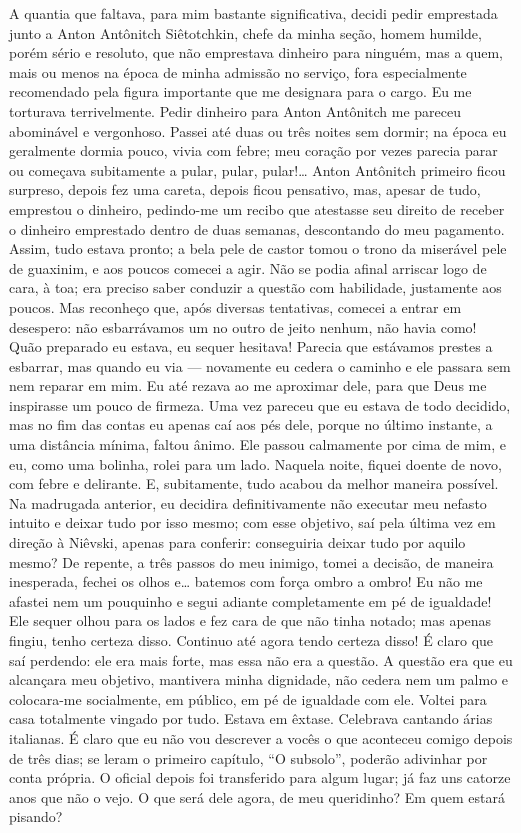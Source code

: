 A quantia que faltava, para mim bastante significativa, decidi pedir
emprestada junto a Anton Antônitch Siêtotchkin, chefe da minha seção,
homem humilde, porém sério e resoluto, que não emprestava dinheiro para
ninguém, mas a quem, mais ou menos na época de minha admissão no
serviço, fora especialmente recomendado pela figura importante que me
designara para o cargo. Eu me torturava terrivelmente. Pedir dinheiro
para Anton Antônitch me pareceu abominável e vergonhoso. Passei até
duas ou três noites sem dormir; na época eu geralmente dormia pouco,
vivia com febre; meu coração por vezes parecia parar ou começava
subitamente a pular, pular, pular!\ldots{} Anton Antônitch primeiro ficou
surpreso, depois fez uma careta, depois ficou pensativo, mas, apesar de
tudo, emprestou o dinheiro, pedindo-me um recibo que atestasse seu
direito de receber o dinheiro emprestado dentro de duas semanas,
descontando do meu pagamento. Assim, tudo estava pronto; a bela pele de
castor tomou o trono da miserável pele de guaxinim, e aos poucos
comecei a agir. Não se podia afinal arriscar logo de cara, à toa; era
preciso saber conduzir a questão com habilidade, justamente aos poucos.
Mas reconheço que, após diversas tentativas, comecei a entrar em
desespero: não esbarrávamos um no outro de jeito nenhum, não havia
como! Quão preparado eu estava, eu sequer hesitava! Parecia que
estávamos prestes a esbarrar, mas quando eu via --- novamente eu cedera o
caminho e ele passara sem nem reparar em mim. Eu até rezava ao me     
aproximar dele, para que Deus me inspirasse um pouco de firmeza. Uma
vez pareceu que eu estava de todo decidido, mas no fim das contas eu
apenas caí aos pés dele, porque no último instante, a uma distância
mínima, faltou ânimo. Ele passou calmamente por cima de mim, e eu, como
uma bolinha, rolei para um lado. Naquela noite, fiquei doente de novo,
com febre e delirante. E, subitamente, tudo acabou da melhor maneira
possível. Na madrugada anterior, eu decidira definitivamente não
executar meu nefasto intuito e deixar tudo por isso mesmo; com esse
objetivo, saí pela última vez em direção à Niêvski, apenas para
conferir: conseguiria deixar tudo por aquilo mesmo? De repente, a três
passos do meu inimigo, tomei a decisão, de maneira inesperada, fechei
os olhos e\ldots{} batemos com força ombro a ombro! Eu não me afastei nem um
pouquinho e segui adiante completamente em pé de igualdade! Ele sequer
olhou para os lados e fez cara de que não tinha notado; mas apenas
fingiu, tenho certeza disso. Continuo até agora tendo certeza disso! É
claro que saí perdendo: ele era mais forte, mas essa não era a questão.
A questão era que eu alcançara meu objetivo, mantivera minha dignidade,
não cedera nem um palmo e colocara-me socialmente, em público, em pé de
igualdade com ele. Voltei para casa totalmente vingado por tudo. Estava
em êxtase. Celebrava cantando árias italianas. É claro que eu não vou
descrever a vocês o que aconteceu comigo depois de três dias; se leram
o primeiro capítulo, “O subsolo”, poderão adivinhar por conta própria.
O oficial depois foi transferido para algum lugar; já faz uns catorze
anos que não o vejo. O que será dele agora, de meu queridinho? Em quem
estará pisando?



